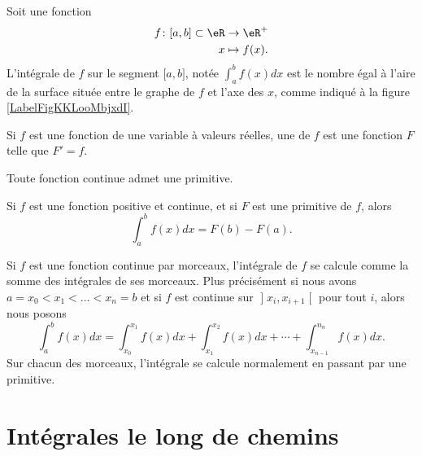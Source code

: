 Soit une fonction
\begin{equation}
    \begin{aligned}
        f\colon \mathopen[ a , b \mathclose]\subset\eR&\to \eR^+ \\
        x&\mapsto f(x) .
    \end{aligned}
\end{equation}
L'intégrale de $f$ sur le segment $\mathopen[ a , b \mathclose]$, notée $\int_a^bf(x)dx$ est le nombre égal à l'aire de la surface située entre le graphe de $f$ et l'axe des $x$, comme indiqué à la figure \ref{LabelFigKKLooMbjxdI}. %
\newcommand{\CaptionFigKKLooMbjxdI}{L'intégrale de $f$ entre $a$ et $b$ représente la surface sous la fonction.}


\begin{definition}
    Si $f$ est une fonction de une variable à valeurs réelles, une  de $f$ est une fonction $F$ telle que $F'=f$.
\end{definition}

Toute fonction continue admet une primitive.

\begin{theorem}
    Si $f$ est une fonction positive et continue, et si $F$ est une primitive de $f$, alors
    \begin{equation}
        \int_a^bf(x)dx=F(b)-F(a).
    \end{equation}
\end{theorem}

\begin{remark}
    Si $f$ est une fonction continue par morceaux, l'intégrale de $f$ se calcule comme la somme des intégrales de ses morceaux. Plus précisément si nous avons $a=x_0<x_1<\ldots<x_n=b$ et si $f$ est continue sur $\mathopen] x_i , x_{i+1} \mathclose[$ pour tout $i$, alors nous posons
    \begin{equation}
        \int_a^bf(x)dx=\int_{x_0}^{x_1}f(x)dx+\int_{x_1}^{x_2}f(x)dx+\cdots+\int_{x_{n-1}}^{n_n}f(x)dx.
    \end{equation}
    Sur chacun des morceaux, l'intégrale se calcule normalement en passant par une primitive.
\end{remark}

\section{Intégrales le long de chemins}

